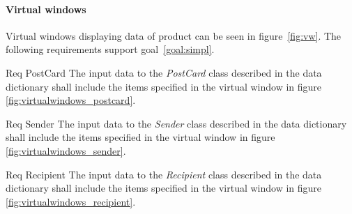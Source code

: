 \documentclass[10pt,a4paper]{article}
\begin{document}
\hrulefill


\paragraph{Virtual windows}
Virtual windows displaying data of product can be seen in figure~\ref{fig:vw}. The following requirements support goal~\ref{goal:simpl}.

\begin {description}
	\item [Req \thesubsubsection {.\thedata} PostCard] The input data to the \textit{PostCard} class described in the data dictionary shall include the items specified in the virtual window in figure \ref{fig:virtualwindows_postcard}.

	\item [Req \thesubsubsection {.\thedata} Sender] The input data to the \textit{Sender} class described in the data dictionary shall include the items specified in the virtual window in figure \ref{fig:virtualwindows_sender}.

	\item [Req \thesubsubsection {.\thedata} Recipient] The input data to the \textit{Recipient} class described in the data dictionary shall include the items specified in the virtual window in figure \ref{fig:virtualwindows_recipient}.

\end{description}
\hfill
\end{document}
